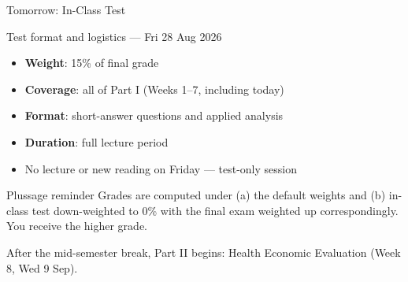 \documentclass[aspectratio=169, 12pt]{beamer}
\begin{document}
\begin{frame}{Tomorrow: In-Class Test}
  \begin{alertblock}{Test format and logistics --- Fri 28 Aug 2026}
    \begin{itemize}
      \item \textbf{Weight}: 15\% of final grade
      \item \textbf{Coverage}: all of Part I (Weeks 1--7, including today)
      \item \textbf{Format}: short-answer questions and applied analysis
      \item \textbf{Duration}: full lecture period
      \item No lecture or new reading on Friday --- test-only session
    \end{itemize}
  \end{alertblock}
  \vspace{0.5em}
  \begin{block}{Plussage reminder}
    Grades are computed under (a) the default weights and (b) in-class test down-weighted
    to 0\% with the final exam weighted up correspondingly.
    You receive the higher grade.
  \end{block}
  \vspace{0.3em}
  {\footnotesize After the mid-semester break, Part II begins: Health Economic Evaluation (Week 8, Wed 9 Sep).}
\end{frame}

\end{document}
